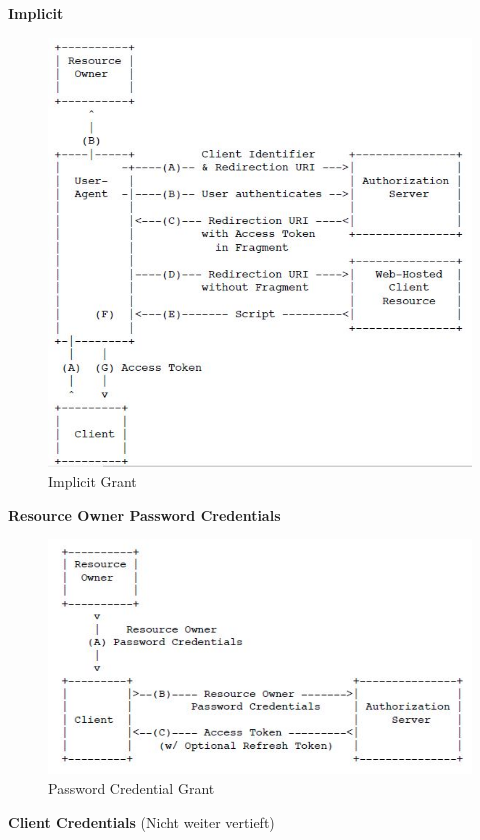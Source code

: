 \newpage
\textbf{Implicit}
\begin{figure}[h!]
	\centering
	\includegraphics[width=0.7\linewidth]{fig/implicit-grant}
	\caption{Implicit Grant}
	\label{fig:implicit-grant}
\end{figure}

\textbf{Resource Owner Password Credentials}
\begin{figure}[h!]
	\centering
	\includegraphics[width=0.7\linewidth]{fig/password-credential-grant}
	\caption{Password Credential Grant}
	\label{fig:password-credential-grant}
\end{figure}

\textbf{Client Credentials} (Nicht weiter vertieft)
